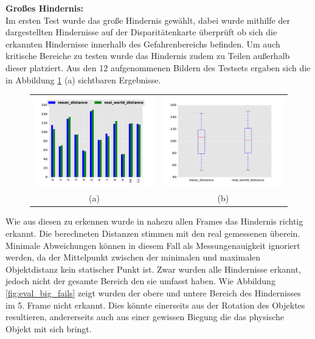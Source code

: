\noindent
\textbf{Großes Hindernis:}\\ 
\noindent
Im ersten Test wurde das große Hindernis gewählt, dabei wurde mithilfe der dargestellten Hindernisse auf der Disparitätenkarte überprüft ob sich die erkannten Hindernisse innerhalb des Gefahrenbereichs befinden. Um auch kritische Bereiche zu testen wurde das Hindernis zudem zu Teilen außerhalb dieser platziert. Aus den 12 aufgenommenen Bildern des Testsets ergaben sich die in Abbildung \ref{fig:eval_big} (a) sichtbaren Ergebnisse.\\

\begin{figure}[h]
	\centering
	\begin{tabular}{cc}
	\includegraphics[width=7cm]{img/evaluation/diagrams/sub_big_bar}&
	\includegraphics[width=7cm]{img/evaluation/diagrams/sub_big_box}\\
	 (a) & (b)
	\end{tabular}
	\caption{}
    \label{fig:eval_big}
\end{figure}

\noindent
Wie aus diesen zu erkennen wurde in nahezu allen Frames das Hindernis richtig erkannt. Die berechneten Distanzen stimmen mit den real gemessenen überein. Minimale Abweichungen können in diesem Fall als Messungenauigkeit ignoriert werden, da der Mittelpunkt zwischen der minimalen und maximalen Objektdistanz kein statischer Punkt ist. Zwar wurden alle Hindernisse erkannt, jedoch nicht der gesamte Bereich den sie umfasst haben. Wie Abbildung \ref{fig:eval_big_fails} zeigt wurden der obere und untere Bereich des Hindernisses im 5. Frame nicht erkannt. Dies könnte einerseits aus der Rotation des Objektes resultieren, andererseits auch aus einer gewissen Biegung die das physische Objekt mit sich bringt.

